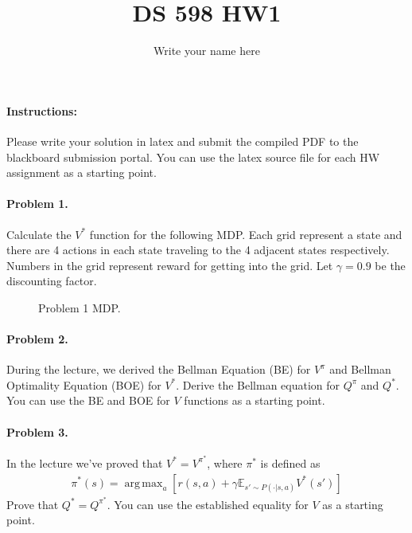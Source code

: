 \documentclass{article}
\title{DS 598 HW1}
\author{Write your name here}
\DeclareMathOperator*{\argmax}{arg\,max}
\newcommand*{\xMin}{0}%
\newcommand*{\xMax}{4}%
\newcommand*{\yMin}{0}%
\newcommand*{\yMax}{4}%
\begin{document}
\maketitle

\paragraph{Instructions:} Please write your solution in latex and submit the compiled PDF to the blackboard submission portal. You can use the latex source file for each HW assignment as a starting point.

\paragraph{Problem 1.} Calculate the $V^*$ function for the following MDP. Each grid represent a state and there are 4 actions in each state traveling to the 4 adjacent states respectively. Numbers in the grid represent reward for getting into the grid. Let $\gamma=0.9$ be the discounting factor.


\begin{figure}[!h]
\centering
{}
\caption{Problem 1 MDP.}
\end{figure}

\paragraph{Problem 2.} During the lecture, we derived the Bellman Equation (BE) for $V^\pi$ and Bellman Optimality Equation (BOE) for $V^*$. Derive the Bellman equation for $Q^\pi$ and $Q^*$. You can use the BE and BOE for $V$ functions as a starting point.

\paragraph{Problem 3.} In the lecture we've proved that $V^* = V^{\pi^*}$, where $\pi^*$ is defined as
\begin{align*}
    \pi^*(s) = \argmax_{a} \left[r(s,a) + \gamma \mathbb{E}_{s'\sim P(\cdot|s,a)}V^*(s')\right]
\end{align*}
Prove that $Q^* = Q^{\pi^*}$. You can use the established equality for $V$ as a starting point.
\end{document}
